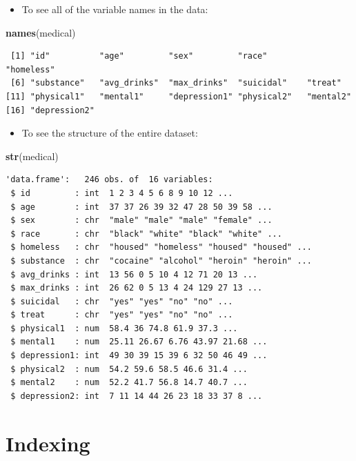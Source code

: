 \documentclass[]{book}
\newenvironment{Shaded}{\begin{snugshade}}{\end{snugshade}}
\newcommand{\KeywordTok}[1]{\textcolor[rgb]{0.13,0.29,0.53}{\textbf{#1}}}
\newcommand{\NormalTok}[1]{#1}
\providecommand{\tightlist}{%
  \setlength{\itemsep}{0pt}\setlength{\parskip}{0pt}}
\begin{document}
\begin{itemize}
\tightlist
\item
  To see all of the variable names in the data:
\end{itemize}

\begin{Shaded}
\begin{Highlighting}[]
\KeywordTok{names}\NormalTok{(medical)}
\end{Highlighting}
\end{Shaded}

\begin{verbatim}
 [1] "id"          "age"         "sex"         "race"        "homeless"   
 [6] "substance"   "avg_drinks"  "max_drinks"  "suicidal"    "treat"      
[11] "physical1"   "mental1"     "depression1" "physical2"   "mental2"    
[16] "depression2"
\end{verbatim}

\begin{itemize}
\tightlist
\item
  To see the structure of the entire dataset:
\end{itemize}

\begin{Shaded}
\begin{Highlighting}[]
\KeywordTok{str}\NormalTok{(medical)}
\end{Highlighting}
\end{Shaded}

\begin{verbatim}
'data.frame':   246 obs. of  16 variables:
 $ id         : int  1 2 3 4 5 6 8 9 10 12 ...
 $ age        : int  37 37 26 39 32 47 28 50 39 58 ...
 $ sex        : chr  "male" "male" "male" "female" ...
 $ race       : chr  "black" "white" "black" "white" ...
 $ homeless   : chr  "housed" "homeless" "housed" "housed" ...
 $ substance  : chr  "cocaine" "alcohol" "heroin" "heroin" ...
 $ avg_drinks : int  13 56 0 5 10 4 12 71 20 13 ...
 $ max_drinks : int  26 62 0 5 13 4 24 129 27 13 ...
 $ suicidal   : chr  "yes" "yes" "no" "no" ...
 $ treat      : chr  "yes" "yes" "no" "no" ...
 $ physical1  : num  58.4 36 74.8 61.9 37.3 ...
 $ mental1    : num  25.11 26.67 6.76 43.97 21.68 ...
 $ depression1: int  49 30 39 15 39 6 32 50 46 49 ...
 $ physical2  : num  54.2 59.6 58.5 46.6 31.4 ...
 $ mental2    : num  52.2 41.7 56.8 14.7 40.7 ...
 $ depression2: int  7 11 14 44 26 23 18 33 37 8 ...
\end{verbatim}

\hypertarget{indexing}{%
\section{Indexing}\label{indexing}}
\end{document}
